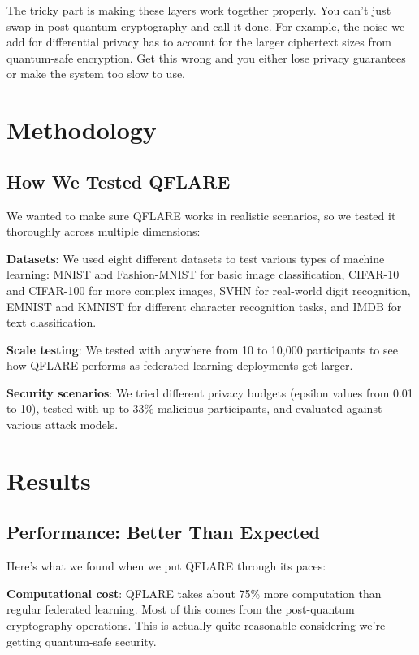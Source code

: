 \documentclass[journal]{IEEEtran}
\begin{document}
The tricky part is making these layers work together properly. You can't just swap in post-quantum cryptography and call it done. For example, the noise we add for differential privacy has to account for the larger ciphertext sizes from quantum-safe encryption. Get this wrong and you either lose privacy guarantees or make the system too slow to use.

\section{Methodology}

\subsection{How We Tested QFLARE}

We wanted to make sure QFLARE works in realistic scenarios, so we tested it thoroughly across multiple dimensions:

\textbf{Datasets}: We used eight different datasets to test various types of machine learning: MNIST and Fashion-MNIST for basic image classification, CIFAR-10 and CIFAR-100 for more complex images, SVHN for real-world digit recognition, EMNIST and KMNIST for different character recognition tasks, and IMDB for text classification.

\textbf{Scale testing}: We tested with anywhere from 10 to 10,000 participants to see how QFLARE performs as federated learning deployments get larger.

\textbf{Security scenarios}: We tried different privacy budgets (epsilon values from 0.01 to 10), tested with up to 33\% malicious participants, and evaluated against various attack models.

\section{Results}

\subsection{Performance: Better Than Expected}

Here's what we found when we put QFLARE through its paces:

\textbf{Computational cost}: QFLARE takes about 75\% more computation than regular federated learning. Most of this comes from the post-quantum cryptography operations. This is actually quite reasonable considering we're getting quantum-safe security.
\end{document}
